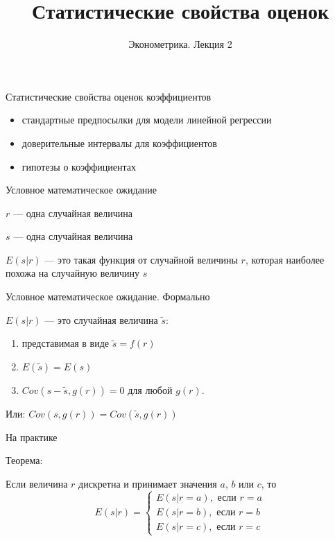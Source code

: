 \documentclass[ignorenonframetext,]{beamer}
\author[Эконометрика. Лекция 2]{Эконометрика. Лекция 2}
\title{Статистические свойства оценок}
\date{}
\begin{document}
\frame{\titlepage}

\begin{frame}{Статистические свойства оценок коэффициентов}

\begin{itemize}
\item
  стандартные предпосылки для модели линейной регрессии
\item
  доверительные интервалы для коэффициентов
\item
  гипотезы о коэффициентах
\end{itemize}

\end{frame}

\begin{frame}{Условное математическое ожидание}

\(r\) --- одна случайная величина

\(s\) --- одна случайная величина

\(E(s|r)\) --- это такая функция от случайной величины \(r\), которая
наиболее похожа на случайную величину \(s\)

\end{frame}

\begin{frame}{Условное математическое ожидание. Формально}

\(E(s|r)\) --- это случайная величина \(\tilde{s}\):

\begin{enumerate}
\def\labelenumi{\arabic{enumi}.}
\item
  представимая в виде \(\tilde{s}=f(r)\)
\item
  \(E(\tilde{s})=E(s)\)
\item
  \(Cov(s-\tilde{s},g(r))=0\) для любой \(g(r)\).
\end{enumerate}

Или: \(Cov(s,g(r))=Cov(\tilde{s},g(r))\)

\end{frame}

\begin{frame}{На практике}

Теорема:

Если величина \(r\) дискретна и принимает значения \(a\), \(b\) или
\(c\), то \[
E(s|r)=\begin{cases}
E(s|r=a), \text{ если } r=a \\
E(s|r=b), \text{ если } r=b \\
E(s|r=c), \text{ если } r=c 
\end{cases}
\]

\end{frame}
\end{document}
